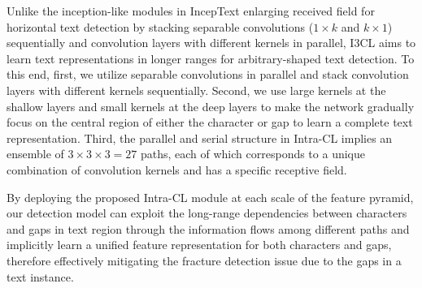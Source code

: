 Unlike the inception-like modules in IncepText \citep{inceptext} enlarging received field for horizontal text detection by stacking separable convolutions ($1\times k$ and $k\times 1$) sequentially and convolution layers with different kernels in parallel, I3CL aims to learn text representations in longer ranges for arbitrary-shaped text detection. To this end, first, we utilize separable convolutions in parallel and stack convolution layers with different kernels sequentially. Second, we use large kernels at the shallow layers and small kernels at the deep layers to make the network gradually focus on the central region of either the character or gap to learn a complete text representation. Third, the parallel and serial structure in Intra-CL implies an ensemble of $3\times 3 \times3=27$ paths, each of which corresponds to a unique combination of convolution kernels and has a specific receptive field.

By deploying the proposed Intra-CL module at each scale of the feature pyramid, our detection model can exploit the long-range dependencies between characters and gaps in text region through the information flows among different paths and implicitly learn a unified feature representation for both characters and gaps, therefore effectively mitigating the fracture detection issue due to the gaps in a text instance.


